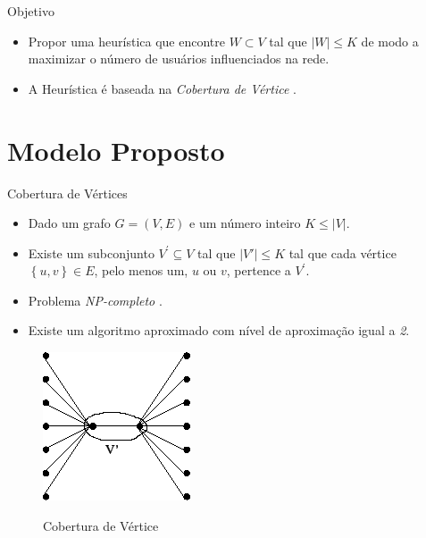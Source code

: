 \documentclass[t,14pt,mathserif,xcolor=table]{beamer}
\begin{document}
\begin{frame}{Objetivo}

	\begin{itemize}
		\item Propor uma heurística que encontre $W \subset V${} tal que $\left\vert W \right\vert\leq K$ de modo a maximizar o número de usuários influenciados na rede.
		
		\item A Heurística é baseada na \textit{Cobertura de Vértice} \cite{Cormen:2009:IAT:1614191}{}.
		
	\end{itemize}
	
\end{frame}

\section{Modelo Proposto}

\begin{frame}{Cobertura de Vértices}

	\begin{itemize}
		\item Dado um grafo $G=(V,E)$ e um número inteiro $K\leq\left\vert V\right\vert$.
		\item Existe um subconjunto $V^{'} \subseteq V$ tal que $\left\vert V '\right\vert\leq K$ tal que cada vértice $\left\{ u,v\right\} \in E$, pelo menos um, $u$ ou $v$, pertence a $V^{'}${}.	
		\item Problema \textit{NP-completo}{} \cite{Garey:1979:CIG:578533, Cormen:2009:IAT:1614191}{}.
		\item Existe um algoritmo aproximado com nível de aproximação igual a \textit{2}.
	\end{itemize}
	
\begin{figure}[!t]
	\centering
	\includegraphics[width=.7in]{../img/vertex_cover.png}
	\label{fig_vertex_cover}
	\caption{Cobertura de Vértice}
\end{figure}
	
\end{frame}
\end{document}
